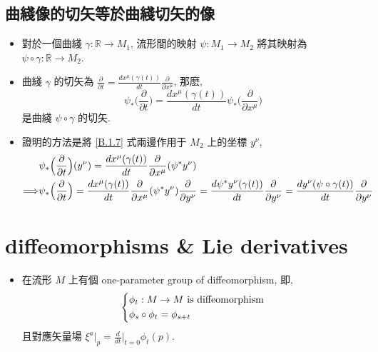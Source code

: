 \subsection{曲綫像的切矢等於曲綫切矢的像} \label{B.1.4}
\begin{itemize}
	\item 對於一個曲綫 $\gamma : \mathbb{R} \rightarrow M_1$, 流形間的映射 $\psi : M_1 \rightarrow M_2$ 將其映射為 $\psi \circ \gamma : \mathbb{R} \rightarrow M_2$.
	
	\item 曲綫 $\gamma$ 的切矢為 $\frac{\partial}{\partial t} = \frac{d x^\mu(\gamma(t))}{dt} \frac{\partial}{\partial x^\mu}$, 那麽,
	\begin{equation} \label{B.1.7}
		\psi_* \Big( \frac{\partial}{\partial t} \Big) = \frac{d x^\mu(\gamma(t))}{dt} \psi_* \Big( \frac{\partial}{\partial x^\mu} \Big)
	\end{equation}
	是曲綫 $\psi \circ \gamma$ 的切矢.
	
	\item 證明的方法是將 \eqref{B.1.7} 式兩邊作用于 $M_2$ 上的坐標 $y^\nu$,
	\begin{align}
		& \psi_* \Big( \frac{\partial}{\partial t} \Big) (y^\nu) = \frac{d x^\mu(\gamma(t))}{dt} \frac{\partial}{\partial x^\mu} (\psi^* y^\nu) \notag \\
		\Longrightarrow & \psi_* \Big( \frac{\partial}{\partial t} \Big) = \frac{d x^\mu(\gamma(t))}{dt} \frac{\partial}{\partial x^\mu} (\psi^* y^\nu) \frac{\partial}{\partial y^\nu} = \frac{d \psi^* y^\nu(\gamma(t))}{dt} \frac{\partial}{\partial y^\nu} = \frac{d y^\nu(\psi \circ \gamma(t))}{dt} \frac{\partial}{\partial y^\nu}
	\end{align}
\end{itemize}

\section{diffeomorphisms \& Lie derivatives}
\begin{itemize}
	\item 在流形 $M$ 上有個 one-parameter group of diffeomorphism, 即,
	\begin{equation}
		\begin{dcases}
			\phi_t : M \rightarrow M \text{ is diffeomorphism} \\
			\phi_s \circ \phi_t = \phi_{s + t}
		\end{dcases}  \label{B.2.1}
	\end{equation}
	且對應矢量場 $\xi^a \Big|_p = \frac{d}{dt} \Big|_{t = 0} \phi_t(p)$.
\end{itemize}

